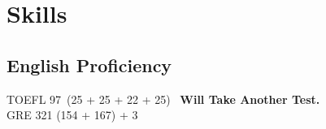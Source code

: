 \documentclass[a4paper]{article}
\begin{document}


\section{Skills}
\vspace{-0.5em}
\subsection{English Proficiency}
\vspace{-0.5em}
TOEFL 97\ (25 + 25 + 22 + 25) \ \textbf{Will Take Another Test.}\\
GRE 321 (154 + 167) + 3
\end{document}
